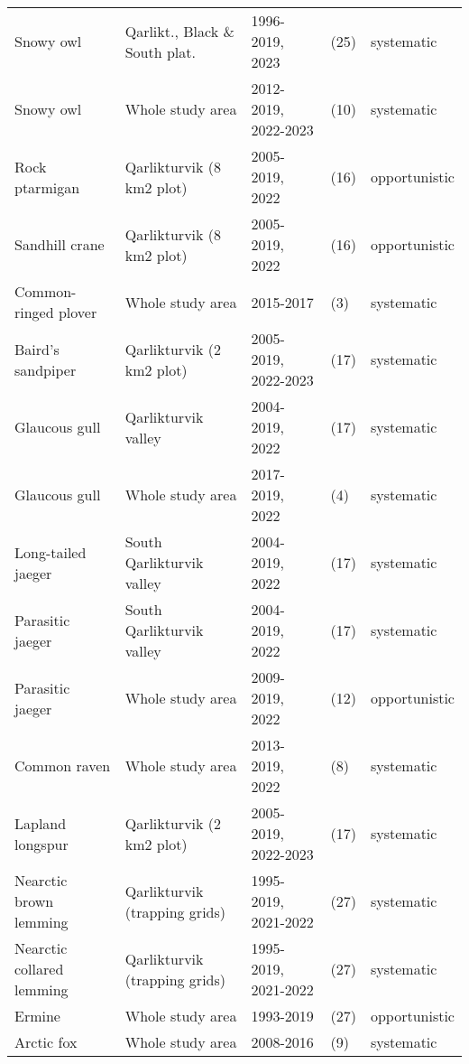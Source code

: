 \begin{table}[ht]
\begin{tabularx}{\textwidth}{lllll}
  Snowy owl & Qarlikt., Black \& South plat. & 1996-2019, 2023 & (25) & systematic \\ 
  Snowy owl & Whole study area & 2012-2019, 2022-2023 & (10) & systematic \\ 
  Rock ptarmigan & Qarlikturvik (8 km2 plot) & 2005-2019, 2022 & (16) & opportunistic \\ 
  Sandhill crane & Qarlikturvik (8 km2 plot) & 2005-2019, 2022 & (16) & opportunistic \\ 
  Common-ringed plover & Whole study area & 2015-2017 & (3) & systematic \\ 
  Baird's sandpiper & Qarlikturvik (2 km2 plot) & 2005-2019, 2022-2023 & (17) & systematic \\ 
  Glaucous gull & Qarlikturvik valley & 2004-2019, 2022 & (17) & systematic \\ 
  Glaucous gull & Whole study area & 2017-2019, 2022 & (4) & systematic \\ 
  Long-tailed jaeger & South Qarlikturvik valley & 2004-2019, 2022 & (17) & systematic \\ 
  Parasitic jaeger & South Qarlikturvik valley & 2004-2019, 2022 & (17) & systematic \\ 
  Parasitic jaeger & Whole study area & 2009-2019, 2022 & (12) & opportunistic \\ 
  Common raven & Whole study area & 2013-2019, 2022 & (8) & systematic \\ 
  Lapland longspur & Qarlikturvik (2 km2 plot) & 2005-2019, 2022-2023 & (17) & systematic \\ 
  Nearctic brown lemming & Qarlikturvik (trapping grids) & 1995-2019, 2021-2022 & (27) & systematic \\ 
  Nearctic collared lemming & Qarlikturvik (trapping grids) & 1995-2019, 2021-2022 & (27) & systematic \\ 
  Ermine & Whole study area & 1993-2019 & (27) & opportunistic \\ 
  Arctic fox & Whole study area & 2008-2016 & (9) & systematic \\ 
   \hline
\end{tabularx}
\endgroup
\end{table}
